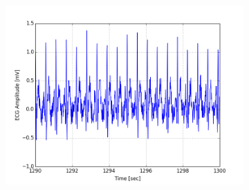 \documentclass[paper=a4, fontsize=11pt]{scrartcl}
\numberwithin{equation}{section}		%
\numberwithin{figure}{section}			%
\numberwithin{table}{section}		    %
\begin{document}
\begin{appendices}
\begin{figure}[H]
\begin{subfigure}[b]{0.3\textwidth}
		\includegraphics[width=\textwidth]{sim/ecg_36}
	\end{subfigure}
\end{figure}


\end{appendices}
\end{document}

